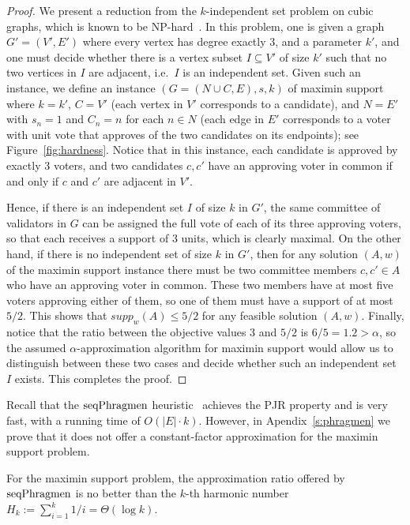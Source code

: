 \begin{proof}
We present a reduction from the $k$-independent set problem on cubic graphs, which is known to be NP-hard~\cite{johnson1979computers}. In this problem, one is given a graph $G'=(V',E')$ where every vertex has degree exactly 3, and a parameter $k'$, and one must decide whether there is a vertex subset $I\subseteq V'$ of size $k'$ such that no two vertices in $I$ are adjacent, i.e.~$I$ is an independent set. 
Given such an instance, we define an instance $(G=(N\cup C, E), s, k)$ of maximin support where $k=k'$, $C=V'$ (each vertex in $V'$ corresponds to a candidate), and $N=E'$ with $s_n=1$ and $C_n=n$ for each $n\in N$ (each edge in $E'$ corresponds to a voter with unit vote that approves of the two candidates on its endpoints); see Figure~\ref{fig:hardness}.
Notice that in this instance, each candidate is approved by exactly 3 voters, and two candidates $c, c'$ have an approving voter in common if and only if $c$ and $c'$ are adjacent in $V'$.

Hence, if there is an independent set $I$ of size $k$ in $G'$, the same committee of validators in $G$ can be assigned the full vote of each of its three approving voters, so that each receives a support of 3 units, which is clearly maximal. On the other hand, if there is no independent set of size $k$ in $G'$, then for any solution $(A,w)$ of the maximin support instance there must be two committee members $c,c'\in A$ who have an approving voter in common. These two members have at most five voters approving either of them, so one of them must have a support of at most $5/2$. This shows that $supp_w(A)\leq 5/2$ for any feasible solution $(A,w)$. Finally, notice that the ratio between the objective values $3$ and $5/2$ is $6/5=1.2>\alpha$, so the assumed $\alpha$-approximation algorithm for maximin support would allow us to distinguish between these two cases and decide whether such an independent set $I$ exists. This completes the proof.
\end{proof}

Recall that the $\operatorname{seqPhragmen}$ heuristic~\cite{brill2017phragmen} achieves the PJR property and is very fast, with a running time of $O(|E|\cdot k)$. However, in Apendix~\ref{s:phragmen} we prove that it does not offer a constant-factor approximation for the maximin support problem. 

\begin{lemma}\label{lem:phragmen}
For the maximin support problem, the approximation ratio offered by $\operatorname{seqPhragmen}$ is no better than the $k$-th harmonic number $H_k:=\sum_{i=1}^k 1/i = \Theta(\log k)$.
\end{lemma}


